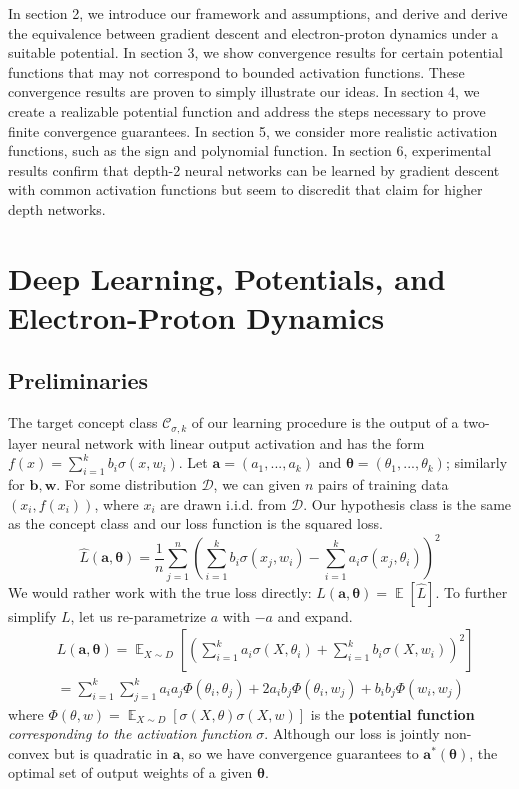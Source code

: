 \documentclass{article}
\DeclareMathOperator*{\expt}{\mathbb{E}}
\begin{document}
In section 2, we introduce our framework and assumptions, and derive
and derive the equivalence between gradient descent and
electron-proton dynamics under a suitable potential. In section 3, we show convergence results for certain potential functions that may not correspond to bounded activation functions. These convergence results are proven to simply illustrate our ideas. In section 4, we create a realizable potential function and address the steps necessary to prove finite convergence guarantees. In section 5, we consider more realistic activation functions, such as the sign and polynomial function. In section 6, experimental
results confirm that depth-2 neural networks can be learned by
gradient descent with common activation functions but seem to
discredit that claim for higher depth networks.

\section{Deep Learning, Potentials, and Electron-Proton Dynamics}

\subsection{Preliminaries}
The target concept class $\mathcal{C}_{\sigma,k}$ of our learning procedure is the output of a two-layer neural network with linear output activation and has the form $f(x) = \sum_{i=1}^k b_i\sigma(x,w_i)$. Let $\boldsymbol{a} = (a_1,...,a_k)$ and $\boldsymbol{\theta} = (\theta_1,...,\theta_k)$; similarly for $\boldsymbol{b}, \boldsymbol{w}$. For some distribution $\mathcal{D}$, we can given $n$ pairs of training data $(x_i, f(x_i))$, where $x_i$ are drawn i.i.d. from $\mathcal{D}$. Our hypothesis class is the same as the concept class and our loss function is the squared loss. 
%
\begin{equation}\label{errEmp}
\widehat{L}(\boldsymbol{a,\theta})  = \frac{1}{n}\sum_{j=1}^n \left(\sum_{i=1}^k b_i\sigma(x_j,w_i) - \sum_{i=1}^k a_i \sigma(x_j,\theta_i)\right)^2
\end{equation}
%
We would rather work with the true loss directly:
$L(\boldsymbol{a,\theta}) = \expt[\widehat{L}]$. To further simplify $L$, let us
re-parametrize $a$ with $-a$ and expand.
\begin{align}
& L(\boldsymbol{a,\theta})  = \expt_{X\sim D}\left[ \left(
  \sum_{i=1}^k a_i \sigma(X,\theta_i) + \sum_{i=1}^k
  b_i\sigma(X,w_i)\right)^2\right] \nonumber \\
%
& = \sum_{i=1}^k \sum_{j=1}^k a_i a_j \Phi(\theta_i,\theta_j)+ 2 a_ib_j \Phi(\theta_i,w_j)+ b_i b_j \Phi(w_i,w_j)
 \label{errLoss}
\end{align}
%
where $\Phi(\theta, w) = \expt_{X\sim D}[ \sigma(X,\theta) \sigma(X,w)]$ is
the {\bf potential function} {\it corresponding to the activation function} $\sigma$. Although our loss is jointly non-convex but is quadratic in $\boldsymbol{a}$, so we have convergence guarantees to $\boldsymbol{a^*(\theta)}$, the optimal set of output weights of a given $\boldsymbol{\theta}$. 
\end{document}
